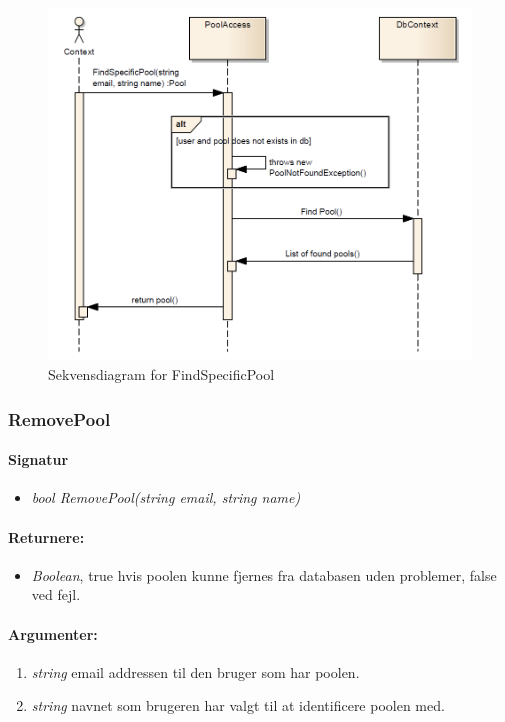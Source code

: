 \begin{figure}
\centering
\includegraphics[width=0.7\linewidth]{figs/dbSeq/findSpecificPool}
\caption{Sekvensdiagram for FindSpecificPool}
\label{fig:findSpecificPool}
\end{figure}







\subsubsection{RemovePool}%

\paragraph{Signatur}
\begin{itemize}
	\item \textit{bool RemovePool(string email, string name)}
\end{itemize}

\paragraph{Returnere:}
\begin{itemize}
	\item \textit{Boolean}, true hvis poolen kunne fjernes fra databasen uden problemer, false ved fejl.
\end{itemize}

\paragraph{Argumenter:}
\begin{enumerate}
	\item \textit{string} email addressen til den bruger som har poolen.
	\item \textit{string} navnet som brugeren har valgt til at identificere poolen med.
\end{enumerate}

